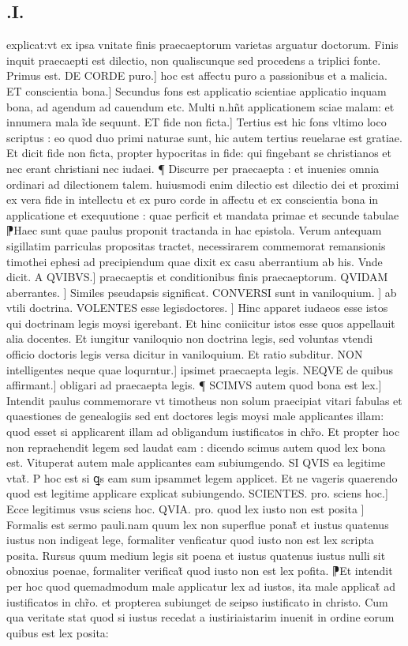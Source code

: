 \documentclass{article}
\begin{document}
\begin{pages}
\section*{.I. }
\marginpar{[ p.140 ]}\pstart explicat:vt ex ipsa vnitate finis praecaeptorum  varietas arguatur doctorum. Finis inquit praecaepti est dilectio, non qualiscunque  sed procedens a triplici fonte. Primus est. DE CORDE puro.] hoc est affectu puro  a passionibus et a malicia. ET conscientia bona.] Secundus fons est applicatio scientiae  applicatio inquam bona, ad agendum  ad cauendum etc. Multi n.hñt applicationem sciae malam: et innumera mala ĩde sequunt. ET fide non ficta.] Tertius est hic fons vltimo loco scriptus : eo quod duo primi naturae sunt, hic autem tertius reuelarae est gratiae. Et dicit fide non ficta,  propter hypocritas in fide: qui fingebant se christianos  et nec erant christiani nec iudaei.  ¶ Discurre per praecaepta : et inuenies omnia ordinari ad dilectionem talem. huiusmodi enim dilectio est dilectio dei et proximi ex vera fide in intellectu  et ex puro corde in affectu  et ex conscientia bona in applicatione et exequutione : quae perficit et mandata primae et secunde tabulae ⁋Haec sunt quae paulus proponit tractanda in hac epistola. Verum antequam sigillatim parriculas propositas tractet, necessirarem commemorat remansionis timothei ephesi ad precipiendum quae dixit ex casu aberrantium ab his. Vnde dicit. A QVIBVS.] praecaeptis et conditionibus finis praecaeptorum. QVIDAM aberrantes. ] Similes pseudapsis significat. CONVERSI sunt in vaniloquium. ] ab vtili doctrina. VOLENTES esse legisdoctores. ] Hinc apparet iudaeos esse istos qui doctrinam legis moysi igerebant. Et hinc coniicitur istos esse quos appellauit alia docentes. Et iungitur vaniloquio non doctrina legis, sed voluntas vtendi officio doctoris legis versa dicitur in vaniloquium. Et ratio subditur. NON intelligentes neque  quae loqurntur.] ipsimet praecaepta legis. NEQVE de quibus affirmant.] obligari ad praecaepta legis.  \pend\pstart ¶ SCIMVS autem quod bona est lex.] Intendit paulus commemorare vt timotheus non solum praecipiat vitari fabulas et quaestiones de genealogiis  sed ent doctores legis moysi male applicantes illam: quod esset si applicarent illam ad obligandum iustificatos in chr̃o. Et propter hoc non repraehendit legem sed laudat eam : dicendo scimus autem quod lex bona est. Vituperat autem male applicantes eam subiumgendo. SI QVIS ea legitime vtat̃. P hoc est si ꝗs eam sum ipsammet legem applicet. Et ne vageris quaerendo quod  est legitime applicare  explicat subiungendo. SCIENTES. pro. sciens  hoc.] Ecce legitimus vsus  sciens hoc. QVIA. pro. quod lex iusto non est posita ] Formalis est sermo pauli.nam quum lex non superflue ponat̃  et iustus quatenus iustus non indigeat lege, formaliter venficatur quod iusto non est lex scripta posita. Rursus quum medium legis sit poena et iustus quatenus iustus nulli sit obnoxius poenae, formaliter verificat̃ quod iusto non est lex pofita. ⁋Et intendit per hoc quod quemadmodum male applicatur lex ad iustos, ita male applicat̃ ad iustificatos in chr̃o. et propterea subiunget de seipso iustificato in christo. Cum qua veritate stat quod si iustus recedat a iustiriaistarim inuenit in ordine eorum quibus est lex posita: 
\end{pages}
\end{document}
